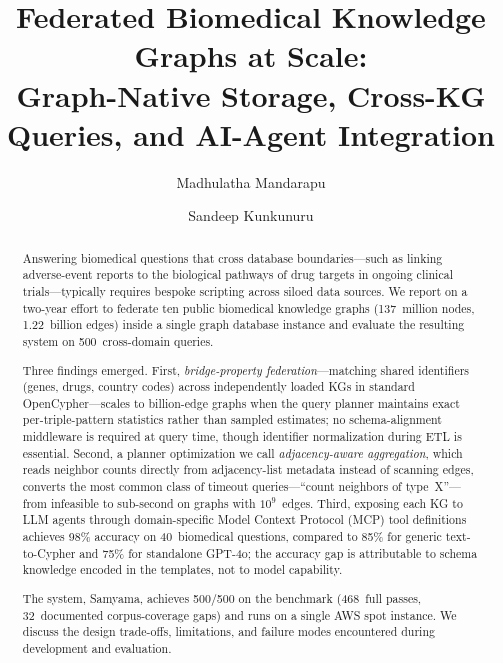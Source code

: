 \documentclass[runningheads]{llncs}
\begin{document}
\title{Federated Biomedical Knowledge Graphs at Scale:\\
Graph-Native Storage, Cross-KG Queries, and AI-Agent Integration}

\author{Madhulatha Mandarapu \and
Sandeep Kunkunuru}



\maketitle

\begin{abstract}
Answering biomedical questions that cross database boundaries---such
as linking adverse-event reports to the biological pathways of drug
targets in ongoing clinical trials---typically requires bespoke
scripting across siloed data sources.  We report on a two-year effort
to federate ten public biomedical knowledge graphs (137~million nodes,
1.22~billion edges) inside a single graph database instance and
evaluate the resulting system on 500~cross-domain queries.

Three findings emerged.
First, \emph{bridge-property federation}---matching shared identifiers
(genes, drugs, country codes) across independently loaded KGs in
standard OpenCypher---scales to billion-edge graphs when the query
planner maintains exact per-triple-pattern statistics rather than
sampled estimates; no schema-alignment middleware is required at query
time, though identifier normalization during ETL is essential.
Second, a planner optimization we call \emph{adjacency-aware
aggregation}, which reads neighbor counts directly from adjacency-list
metadata instead of scanning edges, converts the most common class of
timeout queries---``count neighbors of type~X''---from infeasible to
sub-second on graphs with $10^9$~edges.
Third, exposing each KG to LLM agents through domain-specific
Model Context Protocol (MCP) tool definitions achieves 98\% accuracy
on 40~biomedical questions, compared to 85\% for generic
text-to-Cypher and 75\% for standalone GPT-4o; the accuracy gap is
attributable to schema knowledge encoded in the templates, not to
model capability.

The system, Samyama, achieves 500/500 on the benchmark (468~full
passes, 32~documented corpus-coverage gaps) and runs on a single
AWS spot instance.  We discuss the design trade-offs, limitations,
and failure modes encountered during development and evaluation.

\end{abstract}
\end{document}
